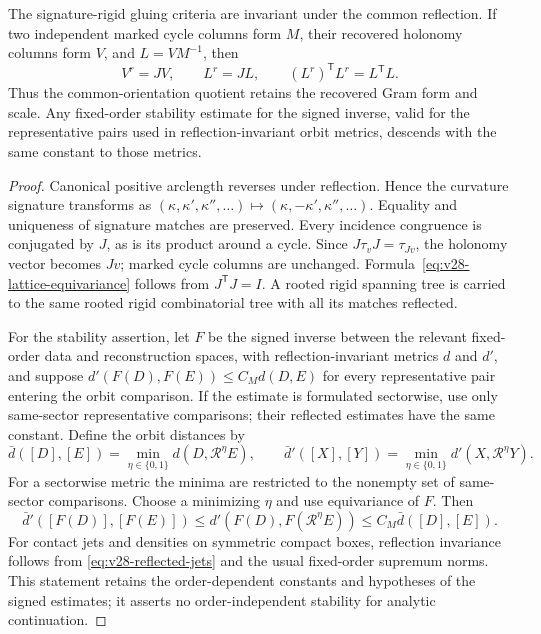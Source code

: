 \begin{corollary}
\label{cor:v28-quotient-holonomy-stability}
The signature-rigid gluing criteria are invariant under the common
reflection.  If two independent marked cycle columns form \(M\), their
recovered holonomy columns form \(V\), and \(L=VM^{-1}\), then
\begin{equation}\label{eq:v28-lattice-equivariance}
 V^r=JV,\qquad L^r=JL,\qquad (L^r)^{\mathsf T}L^r=L^{\mathsf T}L.
\end{equation}
Thus the common-orientation quotient retains the recovered Gram form and
scale.  Any fixed-order stability estimate for the signed inverse, valid for
the representative pairs used in reflection-invariant orbit metrics,
descends with the same constant to those metrics.
\end{corollary}

\begin{proof}
Canonical positive arclength reverses under reflection.  Hence the curvature
signature transforms as
\( (\kappa,\kappa',\kappa'',\ldots)
\mapsto(\kappa,-\kappa',\kappa'',\ldots)\).
Equality and uniqueness of signature matches are preserved.  Every incidence
congruence is conjugated by \(J\), as is its product around a cycle.  Since
\(J\tau_vJ=\tau_{Jv}\), the holonomy vector becomes \(Jv\); marked cycle
columns are unchanged.  Formula~\eqref{eq:v28-lattice-equivariance} follows
from \(J^{\mathsf T}J=I\).  A rooted rigid spanning tree is carried to the
same rooted rigid combinatorial tree with all its matches reflected.

For the stability assertion, let \(F\) be the signed inverse between the
relevant fixed-order data and reconstruction spaces, with reflection-invariant
metrics \(d\) and \(d'\), and suppose
\(d'(F(D),F(E))\le C_Md(D,E)\) for every representative pair entering the orbit comparison.
If the estimate is formulated sectorwise, use only same-sector
representative comparisons; their reflected estimates have the same constant.
Define the orbit distances by
\[
 \bar d([D],[E])=\min_{\eta\in\{0,1\}}d(D,\mathscr R^\eta E),
 \qquad
 \bar d'([X],[Y])=\min_{\eta\in\{0,1\}}d'(X,\mathscr R^\eta Y).
\]
For a sectorwise metric the minima are restricted to the nonempty set of
same-sector comparisons.  Choose a minimizing \(\eta\) and use equivariance
of \(F\).  Then
\[
 \bar d'([F(D)],[F(E)])
 \le d'(F(D),F(\mathscr R^\eta E))
 \le C_M\bar d([D],[E]).
\]
For contact jets and densities on symmetric compact boxes, reflection
invariance follows from \eqref{eq:v28-reflected-jets} and the usual
fixed-order supremum norms.  This statement retains the order-dependent
constants and hypotheses of the signed estimates; it asserts no
order-independent stability for analytic continuation.
\end{proof}

